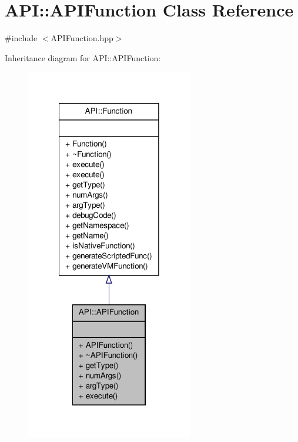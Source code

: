 \hypertarget{class_a_p_i_1_1_a_p_i_function}{\section{A\-P\-I\-:\-:A\-P\-I\-Function Class Reference}
\label{class_a_p_i_1_1_a_p_i_function}
}


{\ttfamily \#include $<$A\-P\-I\-Function.\-hpp$>$}



Inheritance diagram for A\-P\-I\-:\-:A\-P\-I\-Function\-:
\nopagebreak
\begin{figure}[H]
\begin{center}
\leavevmode
\includegraphics[width=206pt]{class_a_p_i_1_1_a_p_i_function__inherit__graph}
\end{center}
\end{figure}


